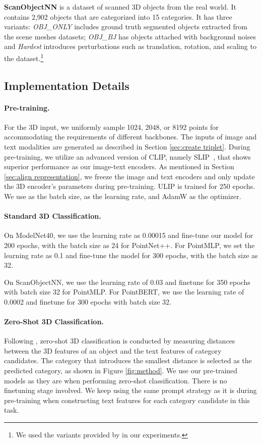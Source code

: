 \documentclass[10pt,twocolumn,letterpaper]{article}
\begin{document}
\noindent\textbf{ScanObjectNN} is a dataset of scanned 3D objects from the real world.
It contains 2,902 objects that are categorized into 15 categories. It has three variants: \emph{OBJ\_ONLY} includes ground truth segmented objects extracted from the scene meshes datasets; \emph{OBJ\_BJ} has objects attached with background noises and \emph{Hardest} introduces perturbations such as translation, rotation, and scaling to the dataset\cite{Uy_2019_ICCV}.\footnote{We used the variants provided by \cite{yu2022point} in our experiments.}

\subsection{Implementation Details}

\paragraph{Pre-training.} For the 3D input, we uniformly sample  1024, 2048, or 8192 points for accommodating the requirements of different backbones. The inputs of image and text modalities are generated as described in Section \ref{sec:create triplet}. During pre-training, we utilize an advanced version of CLIP, namely SLIP~\cite{mu2022slip}, that shows superior performance as our image-text encoders. 
As mentioned in Section \ref{sec:align representation}, we freeze the image and text encoders and only update the 3D encoder's parameters during pre-training. 
ULIP is trained for 250 epochs.
We use  as the batch size,  as the learning rate, and AdamW as the optimizer. 

\vspace{-10pt}
\paragraph{Standard 3D Classification.} On ModelNet40, we use the learning rate as 0.00015 and fine-tune our model for 200 epochs, with the batch size as 24 for PointNet++. 
For PointMLP, we set the learning rate as 0.1 and fine-tune the model for 300 epochs, with the batch size as 32. 


On ScanObjectNN, we use the learning rate of 0.03 and finetune for 350 epochs with batch size 32 for PointMLP. 
For PointBERT, we use the learning rate of 0.0002 and finetune for 300 epochs with batch size 32.

\vspace{-10pt}
\paragraph{Zero-Shot 3D Classification.} Following \cite{zhang2022pointclip}, zero-shot 3D classification is conducted by measuring distances between the 3D features of an object and the text features of category candidates. The category that introduces the smallest distance is selected as the predicted category, as shown in Figure \ref{fig:method}. We use our pre-trained models as they are when performing zero-shot classification. There is no finetuning stage involved. We keep using the same prompt strategy as it is during pre-training when constructing text features for each category candidate in this task.
\end{document}
